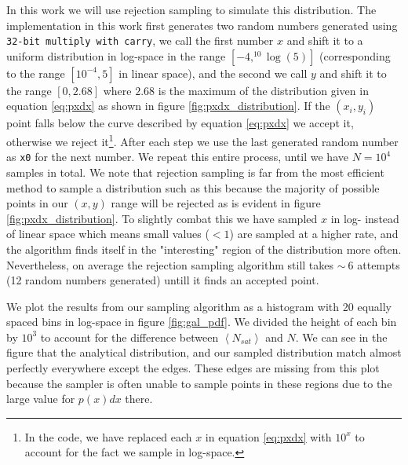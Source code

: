 In this work we will use rejection sampling to simulate this distribution. The implementation in this work first generates two random numbers generated using \texttt{32-bit multiply with carry}, we call the first number $x$ and shift it to a uniform distribution in log-space in the range $\left[-4, ^{10}\log(5)\right]$ (corresponding to the range $\left[10^{-4}, 5\right]$ in linear space), and the second we call $y$ and shift it to the range $\left[0, 2.68\right]$ where $2.68$ is the maximum of the distribution given in equation \ref{eq:pxdx} as shown in figure \ref{fig:pxdx_distribution}. If the $\left(x_i, y_i\right)$ point falls below the curve described by equation \ref{eq:pxdx} we accept it, otherwise we reject it\footnote{In the code, we have replaced each $x$ in equation \ref{eq:pxdx} with $10^x$ to account for the fact we sample in log-space.}. After each step we use the last generated random number as \texttt{x0} for the next number. We repeat this entire process, until we have $N = 10^4$ samples in total. We note that rejection sampling is far from the most efficient method to sample a distribution such as this because the majority of possible points in our $\left(x, y\right)$ range will be rejected as is evident in figure \ref{fig:pxdx_distribution}. To slightly combat this we have sampled $x$ in log- instead of linear space which means small values ($<1$) are sampled at a higher rate, and the algorithm finds itself in the "interesting" region of the distribution more often. Nevertheless, on average the rejection sampling algorithm still takes $\sim~6$ attempts (12 random numbers generated) untill it finds an accepted point.

We plot the results from our sampling algorithm as a histogram with 20 equally spaced bins in log-space in figure \ref{fig:gal_pdf}. We divided the height of each bin by $10^3$ to account for the difference between $\left<N_{sat}\right>$ and $N$. We can see in the figure that the analytical distribution, and our sampled distribution match almost perfectly everywhere except the edges. These edges are missing from this plot because the sampler is often unable to sample points in these regions due to the large value for $p(x)dx$ there.


